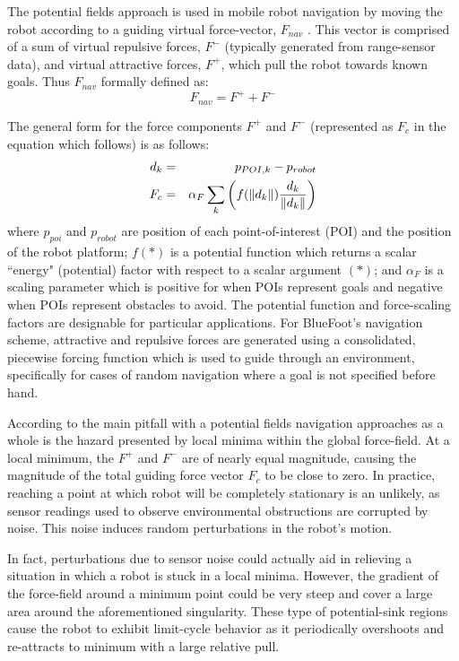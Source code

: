 		The potential fields approach is used in mobile robot navigation by moving the robot according to a guiding virtual force-vector, $F_{nav}$ \cite{Koren1991,ArambulaCosio2004}. This vector is comprised of a sum of virtual repulsive forces, $F^{-}$ (typically generated from range-sensor data), and virtual attractive forces, $F^{+}$, which pull the robot towards known goals. Thus $F_{nav}$ formally defined as:
		\begin{equation}
			F_{nav} = F^{+} + F^{-}
			\label{eq::sumofforces}
		\end{equation}

		The general form for the force components $F^{+}$ and $F^{-}$ (represented as $F_{c}$ in the equation which follows) is as follows:
		\begin{eqnarray}
			d_{k} 	&=& p_{POI,k} - p_{robot} \nonumber\\
			F_{c}	&=& \alpha_{F}\sum_{k}\left( f(\left\lVert d_{k}\right\rVert)\frac{d_{k}}{\left\lVert d_{k}\right\rVert} \right)
			\label{eq::sumofforces}
		\end{eqnarray}	
		where $p_{poi}$ and $p_{robot}$ are position of each \Kth point-of-interest (POI) and the position of the robot platform; $f(*)$ is a potential function which returns a scalar ``energy" (potential) factor with respect to a scalar argument $(*)$; and $\alpha_{F}$ is a scaling parameter which is positive for when POIs represent goals and negative when POIs represent obstacles to avoid. The potential function and force-scaling factors are designable for particular applications. For BlueFoot's navigation scheme, attractive and repulsive forces are generated using a consolidated, piecewise forcing function which is used to guide through an environment, specifically for cases of random navigation where a goal is not specified before hand. 

		According to \cite{Koren1991} the main pitfall with a potential fields navigation approaches as a whole is the hazard presented by local minima within the global force-field. At a local minimum, the $F^{+}$ and $F^{-}$ are of nearly equal magnitude, causing the magnitude of the total guiding force vector $F_{c}$ to be close to zero.  In practice, reaching a point at which robot will be completely stationary is an unlikely, as sensor readings used to observe environmental obstructions are corrupted by noise. This noise induces random perturbations in the robot's motion.

		In fact, perturbations due to sensor noise could actually aid in relieving a situation in which a robot is stuck in a local minima. However, the gradient of the force-field around a minimum point could be very steep and cover a large area around the aforementioned singularity. These type of potential-sink regions cause the robot to exhibit limit-cycle behavior as it periodically overshoots and re-attracts to minimum with a large relative pull. 

